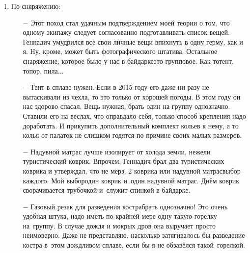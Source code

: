 \begin{enumerate}
	\begin{enumerate}
	\item[$-$] 6 человек\mdash предельное количество народа, когда кончается порядок и начинается хаос. У нас был порядок, чему я несказанно рад. Все экипажи показали себя с лучшей стороны, преодолевая все встретившиеся нам трудности.
	\item[$-$] Ребенку одному в походе было скучновато. Лучше, если детей будет несколько. Тогда они организуют «междусобойчик». Сколько радости принесет им поход сознанием того, что взрослые взяли их на~такое~мероприятие!
	\item[$-$] Опыт чисто мужского похода показывает, что женщин с собой всё\sdash таки надо брать. В их присутствии мужчины стараются не выражаться крепко и вообще ведут себя по\sdash другому. Но и не надо забывать о сказанном Феликсом Квадригиным про женщин в походе. Впрочем, я хочу дополнить его слова о том, что женщины привносят хаос. Это, по моему мнению, касается незамужних дам. Замужние, обычно, пытаются командовать только своими мужьями, а не всеми подряд. Тут уже наше мужское дело давать этому отпор.
	\end{enumerate}	
\item По сняряжению:
	\begin{enumerate}
		\item[$-$] Этот поход стал удачным подтверждением моей теории о том, что одному экипажу следует согласованно подготавливать список вещей. Геннадич умудрился все свои личные вещи впихнуть в одну герму, как и я. Ну, кроме, может быть фотографического штатива. Остальное снаряжение, которое было у нас в байдарке\mdash это групповое. Как то\mdash тент, топор, пила$\ldots$
		\item[$-$] Тент в сплаве нужен. Если в 2015 году его даже ни разу не вытаскивали из чехла, то это только от хорошей погоды. В этом году он нас здорово спасал. Вещь нужная, брать один на группу однозначно. Ставили его на веслах, что оправдало себя, только способ крепления надо доработать. И прикупить дополнительный комплект кольев к нему, а то колья от палаток не слишком годятся по причине своих малых размеров.
		\item[$-$] Надувной матрас лучше изолирует от холода земли, нежели туристический коврик. Впрочем, Геннадич брал два туристических коврика и утверждал, что не мёрз. 2 коврика или надувной матрас\mdash выбор каждого. Мой выбор\mdash один коврик и~один надувной матрас. Днём коврик сворачивается трубочкой и~служит спинкой в байдарке.
		\item[$-$] Газовый резак для разведения костра\mdash брать однозначно! Это очень удобная штука, надо иметь по крайней мере одну такую горелку на~группу. В случае дождя и мокрых дров она выручает просто неимоверно. Даже не представляю, насколько затягивалось бы разведение костра в~этом дождливом сплаве, если бы я не обзавёлся такой~горелкой.

\end{enumerate}
\end{enumerate}
